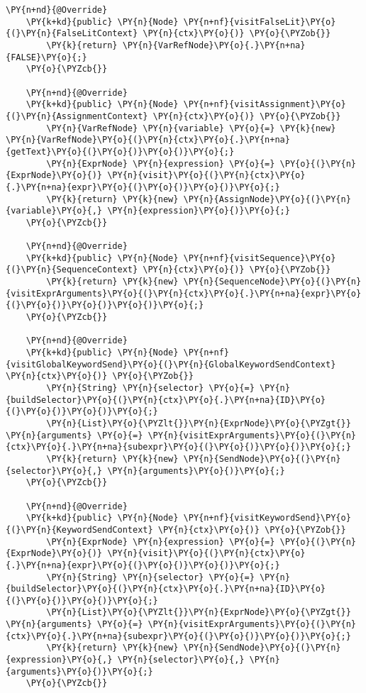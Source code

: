 \begin{Verbatim}[commandchars=\\\{\}]
    \PY{n+nd}{@Override}
    \PY{k+kd}{public} \PY{n}{Node} \PY{n+nf}{visitFalseLit}\PY{o}{(}\PY{n}{FalseLitContext} \PY{n}{ctx}\PY{o}{)} \PY{o}{\PYZob{}}
        \PY{k}{return} \PY{n}{VarRefNode}\PY{o}{.}\PY{n+na}{FALSE}\PY{o}{;}
    \PY{o}{\PYZcb{}}

    \PY{n+nd}{@Override}
    \PY{k+kd}{public} \PY{n}{Node} \PY{n+nf}{visitAssignment}\PY{o}{(}\PY{n}{AssignmentContext} \PY{n}{ctx}\PY{o}{)} \PY{o}{\PYZob{}}
        \PY{n}{VarRefNode} \PY{n}{variable} \PY{o}{=} \PY{k}{new} \PY{n}{VarRefNode}\PY{o}{(}\PY{n}{ctx}\PY{o}{.}\PY{n+na}{getText}\PY{o}{(}\PY{o}{)}\PY{o}{)}\PY{o}{;}
        \PY{n}{ExprNode} \PY{n}{expression} \PY{o}{=} \PY{o}{(}\PY{n}{ExprNode}\PY{o}{)} \PY{n}{visit}\PY{o}{(}\PY{n}{ctx}\PY{o}{.}\PY{n+na}{expr}\PY{o}{(}\PY{o}{)}\PY{o}{)}\PY{o}{;}
        \PY{k}{return} \PY{k}{new} \PY{n}{AssignNode}\PY{o}{(}\PY{n}{variable}\PY{o}{,} \PY{n}{expression}\PY{o}{)}\PY{o}{;}
    \PY{o}{\PYZcb{}}

    \PY{n+nd}{@Override}
    \PY{k+kd}{public} \PY{n}{Node} \PY{n+nf}{visitSequence}\PY{o}{(}\PY{n}{SequenceContext} \PY{n}{ctx}\PY{o}{)} \PY{o}{\PYZob{}}
        \PY{k}{return} \PY{k}{new} \PY{n}{SequenceNode}\PY{o}{(}\PY{n}{visitExprArguments}\PY{o}{(}\PY{n}{ctx}\PY{o}{.}\PY{n+na}{expr}\PY{o}{(}\PY{o}{)}\PY{o}{)}\PY{o}{)}\PY{o}{;}
    \PY{o}{\PYZcb{}}

    \PY{n+nd}{@Override}
    \PY{k+kd}{public} \PY{n}{Node} \PY{n+nf}{visitGlobalKeywordSend}\PY{o}{(}\PY{n}{GlobalKeywordSendContext} \PY{n}{ctx}\PY{o}{)} \PY{o}{\PYZob{}}
        \PY{n}{String} \PY{n}{selector} \PY{o}{=} \PY{n}{buildSelector}\PY{o}{(}\PY{n}{ctx}\PY{o}{.}\PY{n+na}{ID}\PY{o}{(}\PY{o}{)}\PY{o}{)}\PY{o}{;}
        \PY{n}{List}\PY{o}{\PYZlt{}}\PY{n}{ExprNode}\PY{o}{\PYZgt{}} \PY{n}{arguments} \PY{o}{=} \PY{n}{visitExprArguments}\PY{o}{(}\PY{n}{ctx}\PY{o}{.}\PY{n+na}{subexpr}\PY{o}{(}\PY{o}{)}\PY{o}{)}\PY{o}{;}
        \PY{k}{return} \PY{k}{new} \PY{n}{SendNode}\PY{o}{(}\PY{n}{selector}\PY{o}{,} \PY{n}{arguments}\PY{o}{)}\PY{o}{;}
    \PY{o}{\PYZcb{}}

    \PY{n+nd}{@Override}
    \PY{k+kd}{public} \PY{n}{Node} \PY{n+nf}{visitKeywordSend}\PY{o}{(}\PY{n}{KeywordSendContext} \PY{n}{ctx}\PY{o}{)} \PY{o}{\PYZob{}}
        \PY{n}{ExprNode} \PY{n}{expression} \PY{o}{=} \PY{o}{(}\PY{n}{ExprNode}\PY{o}{)} \PY{n}{visit}\PY{o}{(}\PY{n}{ctx}\PY{o}{.}\PY{n+na}{expr}\PY{o}{(}\PY{o}{)}\PY{o}{)}\PY{o}{;}
        \PY{n}{String} \PY{n}{selector} \PY{o}{=} \PY{n}{buildSelector}\PY{o}{(}\PY{n}{ctx}\PY{o}{.}\PY{n+na}{ID}\PY{o}{(}\PY{o}{)}\PY{o}{)}\PY{o}{;}
        \PY{n}{List}\PY{o}{\PYZlt{}}\PY{n}{ExprNode}\PY{o}{\PYZgt{}} \PY{n}{arguments} \PY{o}{=} \PY{n}{visitExprArguments}\PY{o}{(}\PY{n}{ctx}\PY{o}{.}\PY{n+na}{subexpr}\PY{o}{(}\PY{o}{)}\PY{o}{)}\PY{o}{;}
        \PY{k}{return} \PY{k}{new} \PY{n}{SendNode}\PY{o}{(}\PY{n}{expression}\PY{o}{,} \PY{n}{selector}\PY{o}{,} \PY{n}{arguments}\PY{o}{)}\PY{o}{;}
    \PY{o}{\PYZcb{}}


\end{Verbatim}
